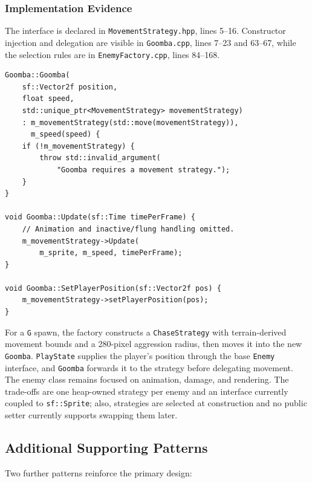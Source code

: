 \documentclass{template}
\begin{document}
\subsubsection{Implementation Evidence}

The interface is declared in \texttt{MovementStrategy.hpp}, lines 5--16.
Constructor injection and delegation are visible in \texttt{Goomba.cpp}, lines
7--23 and 63--67, while the selection rules are in
\texttt{EnemyFactory.cpp}, lines 84--168.

\begin{lstlisting}[style=gamecode,basicstyle=\ttfamily\scriptsize,caption={Strategy ownership and delegation in Goomba.}]
Goomba::Goomba(
    sf::Vector2f position,
    float speed,
    std::unique_ptr<MovementStrategy> movementStrategy)
    : m_movementStrategy(std::move(movementStrategy)),
      m_speed(speed) {
    if (!m_movementStrategy) {
        throw std::invalid_argument(
            "Goomba requires a movement strategy.");
    }
}

void Goomba::Update(sf::Time timePerFrame) {
    // Animation and inactive/flung handling omitted.
    m_movementStrategy->Update(
        m_sprite, m_speed, timePerFrame);
}

void Goomba::SetPlayerPosition(sf::Vector2f pos) {
    m_movementStrategy->setPlayerPosition(pos);
}
\end{lstlisting}

For a \texttt{G} spawn, the factory constructs a \texttt{ChaseStrategy} with
terrain-derived movement bounds and a 280-pixel aggression radius, then moves
it into the new \texttt{Goomba}. \texttt{PlayState} supplies the player's
position through the base \texttt{Enemy} interface, and \texttt{Goomba}
forwards it to the strategy before delegating movement. The enemy class remains
focused on animation, damage, and rendering. The trade-offs are one heap-owned
strategy per enemy and an interface currently coupled to \texttt{sf::Sprite};
also, strategies are selected at construction and no public setter currently
supports swapping them later.

\subsection{Additional Supporting Patterns}
\label{subsec:supporting-patterns}

Two further patterns reinforce the primary design:
\end{document}
